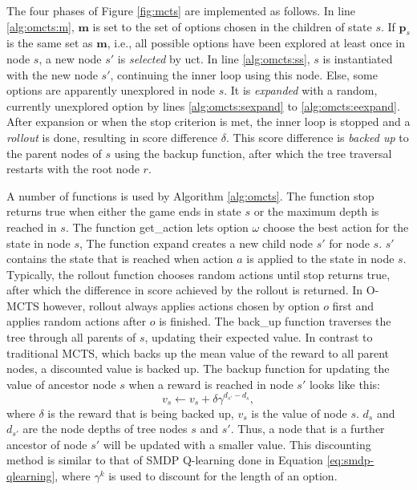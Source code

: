 The four phases of Figure \ref{fig:mcts} are implemented as follows.  In line
\ref{alg:omcts:m}, $\mathbf{m}$ is set to the set of options chosen in the
children of state $s$. If $\mathbf{p}_s$ is the same set as $\mathbf{m}$, i.e.,
all possible options have been explored at least once in node $s$, a new node
$s'$ is \emph{selected} by \textsf{uct}. In line \ref{alg:omcts:ss}, $s$ is
instantiated with the new node $s'$, continuing the inner loop using this node.
Else, some options are apparently unexplored in node $s$. It is \emph{expanded}
with a random, currently unexplored option by lines \ref{alg:omcts:sexpand} to
\ref{alg:omcts:eexpand}. After expansion or when the stop criterion is met,
the inner loop is stopped and a \emph{rollout} is done, resulting in
score difference $\delta$. This score difference is \emph{backed up} to the
parent nodes of $s$ using the backup function, after which the tree traversal
restarts with the root node $r$.

A number of functions is used by Algorithm \ref{alg:omcts}. The function
\textsf{stop} returns true when either the game ends in state $s$ or the maximum
depth is reached in $s$. The function \textsf{get\_action} lets option $\omega$
choose the best action for the state in node $s$, The function \textsf{expand}
creates a new child node $s'$ for node $s$. $s'$ contains the state that is
reached when action $a$ is applied to the state in node $s$. Typically, the
\textsf{rollout} function chooses random actions until \textsf{stop} returns
true, after which the difference in score achieved by the rollout is returned.
In O-MCTS however, \textsf{rollout} always applies actions chosen by option $o$
first and applies random actions after $o$ is finished. The \textsf{back\_up}
function traverses the tree through all parents of $s$, updating their expected
value. In contrast to traditional MCTS, which backs up the mean value of the
reward to all parent nodes, a discounted value is backed up. The backup function
for updating the value of ancestor node $s$ when a reward is reached in node $s'$
looks like this:
\begin{equation}
	\label{eq:backup}
	v_s \gets v_s + \delta\gamma^{d_{s'}-d_{s}},
\end{equation}
where $\delta$ is the reward that is being backed up, $v_s$ is the value of node
$s$. $d_s$ and $d_{s'}$ are the node depths of tree nodes $s$ and $s'$. Thus, a
node that is a further ancestor of node $s'$ will be updated with a smaller
value. This discounting method is similar to that of SMDP Q-learning done in
Equation \ref{eq:smdp-qlearning}, where $\gamma^k$ is used to discount for the
length of an option.

